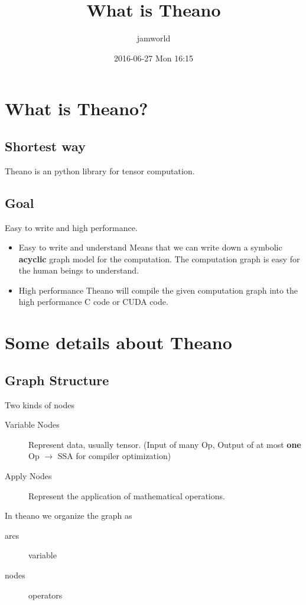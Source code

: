 \documentclass[11pt]{article}
\author{jamworld}
\date{2016-06-27 Mon 16:15}
\title{What is Theano}
\begin{document}
\maketitle

\section*{What is Theano?}
\label{sec:orgheadline5}
\subsection*{Shortest way}
\label{sec:orgheadline1}
Theano is an python library for tensor computation.
\subsection*{Goal}
\label{sec:orgheadline4}
Easy to write and high performance.
\begin{itemize}
\item Easy to write and understand
\label{sec:orgheadline2}
Means that we can write down a symbolic \textbf{acyclic} graph model for the computation. The computation graph is easy for the human beings to understand.
\item High performance
\label{sec:orgheadline3}
Theano will compile the given computation graph into the high performance C code or CUDA code.
\end{itemize}
\section*{Some details about Theano}
\label{sec:orgheadline12}
\subsection*{Graph Structure}
\label{sec:orgheadline6}
Two kinds of nodes
\begin{description}
\item[{Variable Nodes}] Represent data, usually tensor. (Input of many Op, Output of at most \textbf{one} Op \(\rightarrow\) SSA for compiler optimization)
\item[{Apply Nodes}] Represent the application of mathematical operations.
\end{description}
In theano we organize the graph as 
\begin{description}
\item[{arcs}] variable
\item[{nodes}] operators
\end{description}
\end{document}
